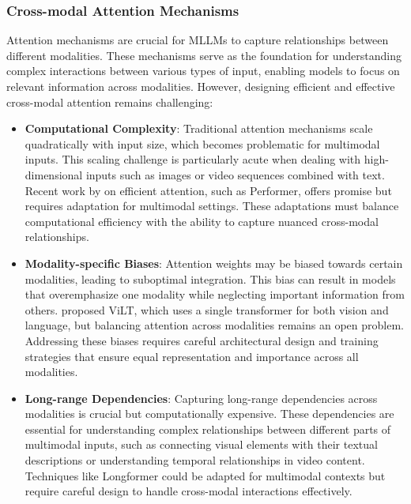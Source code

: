 \subsubsection{Cross-modal Attention Mechanisms}
Attention mechanisms are crucial for MLLMs to capture relationships between different modalities. These mechanisms serve as the foundation for understanding complex interactions between various types of input, enabling models to focus on relevant information across modalities. However, designing efficient and effective cross-modal attention remains challenging:

\begin{itemize}
    \item \textbf{Computational Complexity}: Traditional attention mechanisms scale quadratically with input size, which becomes problematic for multimodal inputs. This scaling challenge is particularly acute when dealing with high-dimensional inputs such as images or video sequences combined with text. Recent work by \citet{choromanski2021rethinking} on efficient attention, such as Performer, offers promise but requires adaptation for multimodal settings. These adaptations must balance computational efficiency with the ability to capture nuanced cross-modal relationships.
    
    \item \textbf{Modality-specific Biases}: Attention weights may be biased towards certain modalities, leading to suboptimal integration. This bias can result in models that overemphasize one modality while neglecting important information from others. \citet{kim2021vilt} proposed ViLT, which uses a single transformer for both vision and language, but balancing attention across modalities remains an open problem. Addressing these biases requires careful architectural design and training strategies that ensure equal representation and importance across all modalities.
    
    \item \textbf{Long-range Dependencies}: Capturing long-range dependencies across modalities is crucial but computationally expensive. These dependencies are essential for understanding complex relationships between different parts of multimodal inputs, such as connecting visual elements with their textual descriptions or understanding temporal relationships in video content. Techniques like Longformer \citep{beltagy2020longformer} could be adapted for multimodal contexts but require careful design to handle cross-modal interactions effectively.
\end{itemize}

